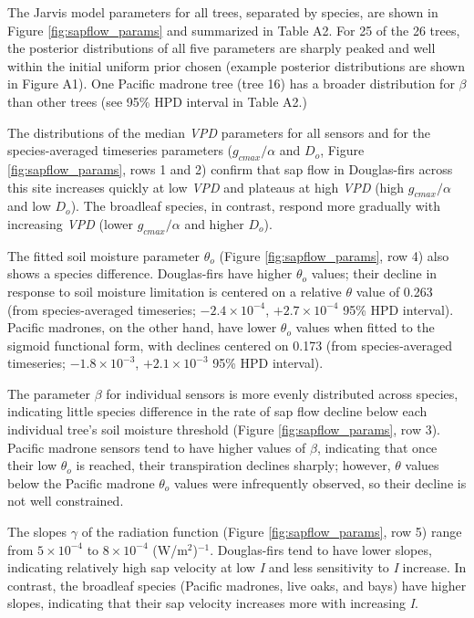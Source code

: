 The Jarvis model parameters for all trees, separated by species, are shown in Figure \ref{fig:sapflow_params} and summarized in Table A2.  For 25 of the 26 trees, the posterior distributions of all five parameters are sharply peaked and well within the initial uniform prior chosen (example posterior distributions are shown in Figure A1).  One Pacific madrone tree (tree 16) has a broader distribution for $\beta$ than other trees (see 95\% HPD interval in Table A2.)

The distributions of the median \textit{VPD} parameters for all sensors and for the species-averaged timeseries parameters ($g_{cmax}/\alpha$ and $D_o$, Figure \ref{fig:sapflow_params}, rows 1 and 2) confirm that sap flow in Douglas-firs across this site increases quickly at low \textit{VPD} and plateaus at high \textit{VPD} (high $g_{cmax}/\alpha$ and low $D_o$).  The broadleaf species, in contrast, respond more gradually with increasing \textit{VPD} (lower $g_{cmax}/\alpha$ and higher $D_o$).

The fitted soil moisture parameter $\theta_o$ (Figure \ref{fig:sapflow_params}, row 4) also shows a species difference.  Douglas-firs have higher $\theta_o$ values; their decline in response to soil moisture limitation is centered on a relative $\theta$ value of 0.263 (from species-averaged timeseries;  $-2.4 \times 10^{-4}$, $+2.7 \times 10^{-4}$ 95\% HPD interval).  Pacific madrones, on the other hand, have lower $\theta_o$ values when fitted to the sigmoid functional form, with declines centered on 0.173 (from species-averaged timeseries; $-1.8 \times 10^{-3}$, $+2.1 \times 10^{-3}$ 95\% HPD interval).

The parameter $\beta$ for individual sensors is more evenly distributed across species, indicating little species difference in the rate of sap flow decline below each individual tree's soil moisture threshold (Figure \ref{fig:sapflow_params}, row 3).  Pacific madrone sensors tend to have higher values of $\beta$, indicating that once their low $\theta_o$ is reached, their transpiration declines sharply; however, $\theta$ values below the Pacific madrone $\theta_o$ values were infrequently observed, so their decline is not well constrained.

The slopes $\gamma$ of the radiation function (Figure \ref{fig:sapflow_params}, row 5) range from $5 \times 10^{-4}$ to $8 \times 10^{-4}$ (W/m$^2$)$^{-1}$.  Douglas-firs tend to have lower slopes, indicating relatively high sap velocity at low \textit{I} and less sensitivity to \textit{I} increase.  In contrast, the broadleaf species (Pacific madrones, live oaks, and bays) have higher slopes, indicating that their sap velocity increases more with increasing \textit{I}.

